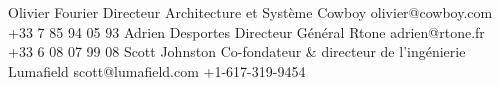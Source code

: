%
%
%


\begin{referees}
		{Olivier Fourier}
		{Directeur Architecture et Système}
		{Cowboy}
		{olivier@cowboy.com}
		{+33 7 85 94 05 93}
		{Adrien Desportes}
		{Directeur Général}
		{Rtone}
		{adrien@rtone.fr}
		{+33 6 08 07 99 08}
		{Scott Johnston}
		{Co-fondateur \& directeur de l'ingénierie}
		{Lumafield}
		{scott@lumafield.com}
		{+1-617-319-9454}
\end{referees}


